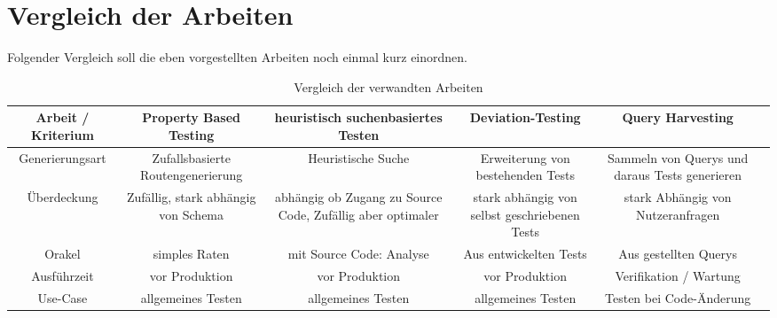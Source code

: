 \section{Vergleich der Arbeiten}
Folgender Vergleich soll die eben vorgestellten Arbeiten noch einmal kurz einordnen.
\begin{center}
    \begin{table}[!hbt]
        \begin{tabularx}{\textwidth}{|C|C|C|C|C|C|}
            \hline
            \textbf{ Arbeit / Kriterium} & \textbf{Property Based Testing} & \textbf{heuristisch suchenbasiertes Testen} & \textbf{Deviation-Testing} & \textbf{Query Harvesting} \\
            \hline
            Generierungsart & Zufallsbasierte Routengenerierung & Heuristische Suche & Erweiterung von bestehenden Tests & Sammeln von Querys und daraus Tests generieren \\
            \hline
            Überdeckung & Zufällig, stark abhängig von Schema  & abhängig ob Zugang zu Source Code, Zufällig aber optimaler & stark abhängig von selbst geschriebenen Tests  & stark Abhängig von Nutzeranfragen \\
            \hline
            Orakel & simples Raten & mit Source Code: Analyse & Aus entwickelten Tests &  Aus gestellten Querys \\
            \hline
            Ausführzeit & vor Produktion & vor Produktion & vor Produktion & Verifikation / Wartung \\
            \hline
            Use-Case & allgemeines Testen & allgemeines Testen & allgemeines Testen & Testen bei Code-Änderung \\
            \hline
        \end{tabularx}
        \caption{Vergleich der verwandten Arbeiten}
    \end{table}
\end{center}


